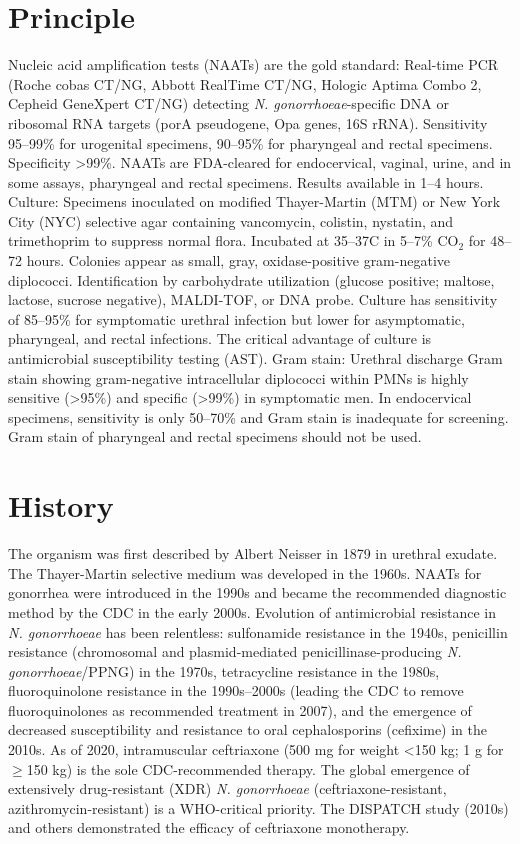 \section*{Principle}
Nucleic acid amplification tests (NAATs) are the gold standard: Real-time PCR (Roche cobas CT/NG, Abbott RealTime CT/NG, Hologic Aptima Combo 2, Cepheid GeneXpert CT/NG) detecting \textit{N. gonorrhoeae}-specific DNA or ribosomal RNA targets (porA pseudogene, Opa genes, 16S rRNA). Sensitivity 95--99\% for urogenital specimens, 90--95\% for pharyngeal and rectal specimens. Specificity >99\%. NAATs are FDA-cleared for endocervical, vaginal, urine, and in some assays, pharyngeal and rectal specimens. Results available in 1--4 hours. Culture: Specimens inoculated on modified Thayer-Martin (MTM) or New York City (NYC) selective agar containing vancomycin, colistin, nystatin, and trimethoprim to suppress normal flora. Incubated at 35--37\textdegree{}C in 5--7\% CO$_2$ for 48--72 hours. Colonies appear as small, gray, oxidase-positive gram-negative diplococci. Identification by carbohydrate utilization (glucose positive; maltose, lactose, sucrose negative), MALDI-TOF, or DNA probe. Culture has sensitivity of 85--95\% for symptomatic urethral infection but lower for asymptomatic, pharyngeal, and rectal infections. The critical advantage of culture is antimicrobial susceptibility testing (AST). Gram stain: Urethral discharge Gram stain showing gram-negative intracellular diplococci within PMNs is highly sensitive (>95\%) and specific (>99\%) in symptomatic men. In endocervical specimens, sensitivity is only 50--70\% and Gram stain is inadequate for screening. Gram stain of pharyngeal and rectal specimens should not be used.

\section*{History}
The organism was first described by Albert Neisser in 1879 in urethral exudate. The Thayer-Martin selective medium was developed in the 1960s. NAATs for gonorrhea were introduced in the 1990s and became the recommended diagnostic method by the CDC in the early 2000s. Evolution of antimicrobial resistance in \textit{N. gonorrhoeae} has been relentless: sulfonamide resistance in the 1940s, penicillin resistance (chromosomal and plasmid-mediated penicillinase-producing \textit{N. gonorrhoeae}/PPNG) in the 1970s, tetracycline resistance in the 1980s, fluoroquinolone resistance in the 1990s--2000s (leading the CDC to remove fluoroquinolones as recommended treatment in 2007), and the emergence of decreased susceptibility and resistance to oral cephalosporins (cefixime) in the 2010s. As of 2020, intramuscular ceftriaxone (500 mg for weight <150 kg; 1 g for $\geq$150 kg) is the sole CDC-recommended therapy. The global emergence of extensively drug-resistant (XDR) \textit{N. gonorrhoeae} (ceftriaxone-resistant, azithromycin-resistant) is a WHO-critical priority. The DISPATCH study (2010s) and others demonstrated the efficacy of ceftriaxone monotherapy.

